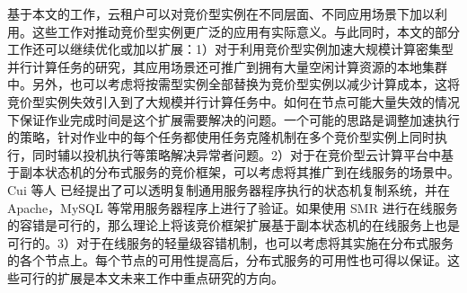 基于本文的工作，云租户可以对竞价型实例在不同层面、不同应用场景下加以利用。这些工作对推动竞价型实例更广泛的应用有实际意义。与此同时，本文的部分工作还可以继续优化或加以扩展：1）对于利用竞价型实例加速大规模计算密集型并行计算任务的研究，其应用场景还可推广到拥有大量空闲计算资源的本地集群中。另外，也可以考虑将按需型实例全部替换为竞价型实例以减少计算成本，这将竞价型实例失效引入到了大规模并行计算任务中。如何在节点可能大量失效的情况下保证作业完成时间是这个扩展需要解决的问题。一个可能的思路是调整加速执行的策略，针对作业中的每个任务都使用任务克隆机制在多个竞价型实例上同时执行，同时辅以投机执行等策略解决异常者问题。2）对于在竞价型云计算平台中基于副本状态机的分布式服务的竞价框架，可以考虑将其推广到在线服务的场景中。Cui 等人 \cite{Cui:2015:PAM:2815400.2815427} 已经提出了可以透明复制通用服务器程序执行的状态机复制系统，并在 Apache，MySQL 等常用服务器程序上进行了验证。如果使用 SMR 进行在线服务的容错是可行的，那么理论上将该竞价框架扩展基于副本状态机的在线服务上也是可行的。3）对于在线服务的轻量级容错机制，也可以考虑将其实施在分布式服务的各个节点上。每个节点的可用性提高后，分布式服务的可用性也可得以保证。这些可行的扩展是本文未来工作中重点研究的方向。